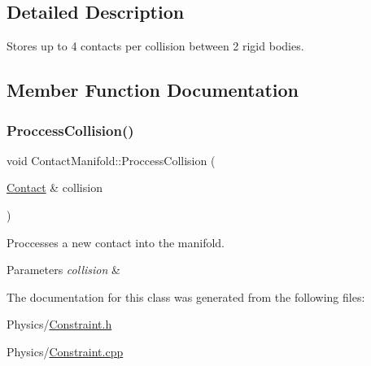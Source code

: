 \subsection{Detailed Description}
Stores up to 4 contacts per collision between 2 rigid bodies. 

\subsection{Member Function Documentation}
\mbox{\label{classContactManifold_ab435616e119010a5904ff0833519bf52}} 
\subsubsection{\texorpdfstring{Proccess\+Collision()}{ProccessCollision()}}
{\footnotesize\ttfamily void Contact\+Manifold\+::\+Proccess\+Collision (\begin{DoxyParamCaption}\item[{\hyperlink{classContact}{Contact} \&}]{collision }\end{DoxyParamCaption})}



Proccesses a new contact into the manifold. 


\begin{DoxyParams}{Parameters}
{\em collision} & \\
\hline
\end{DoxyParams}


The documentation for this class was generated from the following files\+:\begin{DoxyCompactItemize}
\item 
Physics/\hyperlink{Constraint_8h}{Constraint.\+h}\item 
Physics/\hyperlink{Constraint_8cpp}{Constraint.\+cpp}\end{DoxyCompactItemize}
